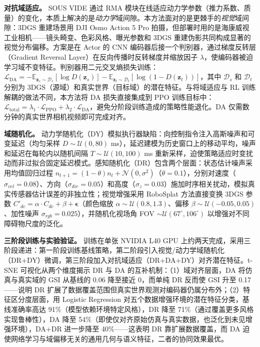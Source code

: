 \textbf{对抗域适应。}
SOUS VIDE 通过 RMA 模块在线适应动力学参数（推力系数、质量）的变化，本质上解决的是\emph{动力学}域间隙。本方法面对的是更棘手的\emph{视觉}域间隙：3DGS 重建场景用 DJI Osmo Action 5 Pro 拍摄，但部署时用的是海康威视工业相机——镜头畸变、色彩风格、曝光参数和 3DGS 重建伪影共同构成显著的视觉分布偏移。方案是在 Actor 的 CNN 编码器后接一个判别器，通过梯度反转层（Gradient Reversal Layer）在反向传播时反转梯度并缩放因子 $\lambda$，使编码器被迫学习域不变特征。判别器用二元交叉熵损失训练：$\mathcal{L}_{\text{DA}} = -\mathbb{E}_{\bm{z}_s \sim \mathcal{D}_s}[\log D(\bm{z}_s)] - \mathbb{E}_{\bm{z}_t \sim \mathcal{D}_t}[\log(1 - D(\bm{z}_t))]$，其中 $\mathcal{D}_s$ 和 $\mathcal{D}_t$ 分别为 3DGS（源域）和真实世界（目标域）的潜在特征。与将域适应与 RL 训练解耦的做法不同，本方法将 DA 损失直接集成到 PPO 训练目标中：$\mathcal{L}_{\text{total}} = \lambda_1 \cdot \mathcal{L}_{\text{PPO}} + \lambda_2 \cdot \mathcal{L}_{\text{DA}}$，避免分阶段训练造成的策略性能退化。DA 仅需数分钟的真实世界相机视频即可完成对齐。

\textbf{域随机化。}
动力学随机化（DY）模拟执行器缺陷：向控制指令注入高斯噪声和可变延迟（均匀采样 $D \sim \mathcal{U}(0, 80)$ ms），延迟建模为历史窗口上的移动平均，噪声和延迟在每轮内以随机间隔 $T \sim \mathcal{U}(10, 100)$ ms 重新采样，迫使策略适应时变扰动而非过拟合固定延迟模式。感知随机化（DR）包含两个层面：状态估计噪声采用均值回归过程 $n_{t+1} = (1 - \theta) n_t + \mathcal{N}(0, \sigma^2)$（$\theta = 0.1$），分别对速度（$\sigma_{vel} = 0.08$）、方向（$\sigma_{dir} = 0.05$）和高度（$\sigma_z = 0.03$）施加时序相关扰动，模拟真实传感器估计误差的非独立性；视觉增强采用 RoboSplat 方法直接变换 3DGS 参数 $C'_{dc} = \alpha \cdot C_{dc} + \beta + \bm{\epsilon}$（颜色缩放 $\alpha \sim \mathcal{U}(0.8, 1.3)$、偏移 $\beta \sim \mathcal{U}(-0.05, 0.05)$、加性噪声 $\sigma_{rgb} = 0.025$），并随机化视场角 FOV $\sim \mathcal{U}(67^\circ, 106^\circ)$ 以增强对不同障碍物尺度的泛化。

\textbf{三阶段训练与实验验证。}
训练在单张 NVIDIA L40 GPU 上约两天完成，采用三阶段递进：第一阶段训练基线策略，第二阶段引入视觉/动力学域随机化（DR+DY）微调，第三阶段加入对抗域适应（DR+DA+DY）对齐潜在特征。t-SNE 可视化从两个维度揭示 DR 与 DA 的互补机制：（1）域对齐层面，DA 将仿真与真实域的 GSI 从基线的 0.06 降至接近 0，而单纯 DR 反而使 GSI 升至 0.17——说明 DR 扩展了数据覆盖范围但真实世界观测对编码器仍属分布外；（2）特征区分度层面，用 Logistic Regression 对五个数据增强环境的潜在特征分类，基线准确率高达 91\%（模型依赖环境特定风格），DR 降至 71\%（通过覆盖更多风格实现鲁棒性），DA 降至 54\%（即使仅对齐原始仿真与真实数据，也泛化到未见增强环境），DA+DR 进一步降至 40\%——这表明 DR 靠扩展数据覆盖，而 DA 迫使网络学习与域偏移无关的通用几何与语义特征，二者的协同效果最优。

